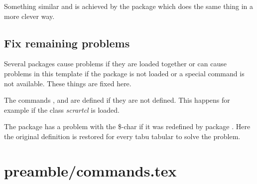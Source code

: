 Something similar and is achieved by the package  which does the same thing in a more clever way.


\subsection{Fix remaining problems}
\label{sec:style:fix}

Several packages cause problems if they are loaded together or can cause problems in this template if the package is not loaded or a special command is not available. These things are fixed here.

The commands ,  and  are defined if they are not defined. This happens for example if the class \emph{scrartcl} is loaded.

The package  has a problem with the \$-char if it was redefined by package . Here the original definition is restored for every tabu tabular to solve the problem.



%
%
%
%
%


\section{preamble/commands.tex}

